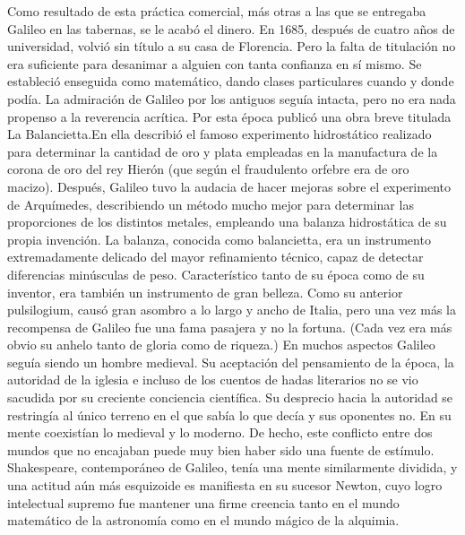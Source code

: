 \documentclass[letterpaper, 10pt, journal]{IEEEtran}
\begin{document}
\newline
Como resultado de esta práctica comercial, más otras a las que se entregaba Galileo en las tabernas, se le acabó el dinero. En 1685, después de cuatro años de universidad, volvió sin título a su casa de Florencia. Pero la falta de titulación no era suficiente para desanimar a alguien con tanta confianza en sí mismo. Se estableció enseguida como matemático, dando clases particulares cuando y donde podía. \cite{[1]}
\newline
La admiración de Galileo por los antiguos seguía intacta, pero no era nada propenso a la reverencia acrítica. Por esta época publicó una obra breve titulada La Balancietta.En ella describió el famoso experimento hidrostático realizado para determinar la cantidad de oro y plata empleadas en la manufactura de la corona de oro del rey Hierón (que según el fraudulento orfebre era de oro macizo). Después, Galileo tuvo la audacia de hacer mejoras sobre el experimento de Arquímedes, describiendo un método mucho mejor para determinar las proporciones de los distintos metales, empleando una balanza hidrostática de su propia invención. La balanza, conocida como balancietta, era un instrumento extremadamente delicado del mayor refinamiento técnico, capaz de detectar diferencias minúsculas de peso. Característico tanto de su época como de su inventor, era también un instrumento de gran belleza. Como su anterior pulsilogium, causó gran asombro a lo largo y ancho de Italia, pero una vez más la recompensa de Galileo fue una fama pasajera y no la fortuna. (Cada vez era más obvio su anhelo tanto de gloria como de riqueza.)\cite{[2]}
\newline
En muchos aspectos Galileo seguía siendo un hombre medieval. Su aceptación del pensamiento de la época, la autoridad de la iglesia e incluso de los cuentos de hadas literarios no se vio sacudida por su creciente conciencia científica. Su desprecio hacia la autoridad se restringía al único terreno en el que sabía lo que decía y sus oponentes no. En su mente coexistían lo medieval y lo moderno. De hecho, este conflicto entre dos mundos que no encajaban puede muy bien haber sido una fuente de estímulo. Shakespeare, contemporáneo de Galileo, tenía una mente similarmente dividida, y una actitud aún más esquizoide es manifiesta en su sucesor Newton, cuyo logro intelectual supremo fue mantener una firme creencia tanto en el mundo matemático de la astronomía como en el mundo mágico de la alquimia.\cite{[1]}
\newline
\end{document}
